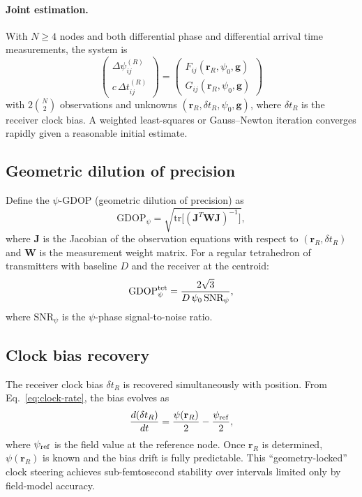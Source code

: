 \documentclass[aps,prd,twocolumn,superscriptaddress,nofootinbib]{revtex4-2}
\begin{document}
\paragraph{Joint estimation.}
With $N \geq 4$ nodes and both differential phase and differential
arrival time measurements, the system is
\begin{equation}\label{eq:full-system}
\begin{pmatrix} \Delta\psi_{ij}^{(R)} \\ c\,\Delta t_{ij}^{(R)} \end{pmatrix}
= \begin{pmatrix} F_{ij}(\mathbf{r}_R, \psi_0, \mathbf{g}) \\
G_{ij}(\mathbf{r}_R, \psi_0, \mathbf{g}) \end{pmatrix}
\end{equation}
with $2\binom{N}{2}$ observations and unknowns
$(\mathbf{r}_R, \delta t_R, \psi_0, \mathbf{g})$, where
$\delta t_R$ is the receiver clock bias. A weighted least-squares or
Gauss--Newton iteration converges rapidly given a reasonable initial
estimate.

\subsection{Geometric dilution of precision}\label{sec:GDOP}

Define the $\psi$-GDOP (geometric dilution of precision) as
\begin{equation}\label{eq:GDOP}
\text{GDOP}_\psi = \sqrt{\mathrm{tr}\bigl[(\mathbf{J}^T \mathbf{W}
\mathbf{J})^{-1}\bigr]},
\end{equation}
where $\mathbf{J}$ is the Jacobian of the observation equations with
respect to $(\mathbf{r}_R, \delta t_R)$ and $\mathbf{W}$ is the
measurement weight matrix. For a regular tetrahedron of transmitters
with baseline $D$ and the receiver at the centroid:
\begin{equation}\label{eq:GDOP-tet}
\text{GDOP}_\psi^{\rm tet} = \frac{2\sqrt{3}}{D\,\psi_0\,\text{SNR}_\psi},
\end{equation}
where $\text{SNR}_\psi$ is the $\psi$-phase signal-to-noise ratio.

\subsection{Clock bias recovery}\label{sec:clock-bias}

The receiver clock bias $\delta t_R$ is recovered simultaneously with
position. From Eq.~\eqref{eq:clock-rate}, the bias evolves as
\begin{equation}\label{eq:bias-evolution}
\frac{d(\delta t_R)}{dt} = \frac{\psi(\mathbf{r}_R)}{2}
- \frac{\psi_{\rm ref}}{2},
\end{equation}
where $\psi_{\rm ref}$ is the field value at the reference node. Once
$\mathbf{r}_R$ is determined, $\psi(\mathbf{r}_R)$ is known and the
bias drift is fully predictable. This ``geometry-locked'' clock
steering achieves sub-femtosecond stability over intervals limited
only by field-model accuracy.
\end{document}
